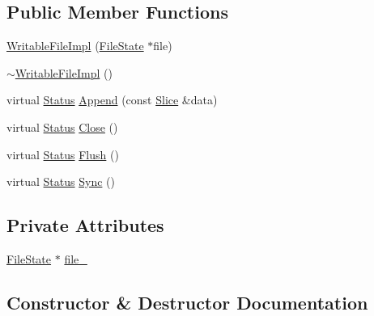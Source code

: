 \subsection*{Public Member Functions}
\begin{DoxyCompactItemize}
\item 
\hyperlink{classleveldb_1_1anonymous__namespace_02memenv_8cc_03_1_1_writable_file_impl_a564257ffed2caac8d8375fd25dcf92de}{Writable\+File\+Impl} (\hyperlink{classleveldb_1_1anonymous__namespace_02memenv_8cc_03_1_1_file_state}{File\+State} $\ast$file)
\item 
\hyperlink{classleveldb_1_1anonymous__namespace_02memenv_8cc_03_1_1_writable_file_impl_ab988ef6951b1474cc540c38fa0c0c225}{$\sim$\+Writable\+File\+Impl} ()
\item 
virtual \hyperlink{classleveldb_1_1_status}{Status} \hyperlink{classleveldb_1_1anonymous__namespace_02memenv_8cc_03_1_1_writable_file_impl_ad4dab8366ba1d0bba09026209ea6d9fb}{Append} (const \hyperlink{classleveldb_1_1_slice}{Slice} \&data)
\item 
virtual \hyperlink{classleveldb_1_1_status}{Status} \hyperlink{classleveldb_1_1anonymous__namespace_02memenv_8cc_03_1_1_writable_file_impl_a61415505144e7fe22e40e3d88682e1af}{Close} ()
\item 
virtual \hyperlink{classleveldb_1_1_status}{Status} \hyperlink{classleveldb_1_1anonymous__namespace_02memenv_8cc_03_1_1_writable_file_impl_a46189d9bb58693915d9970b6dcd6d720}{Flush} ()
\item 
virtual \hyperlink{classleveldb_1_1_status}{Status} \hyperlink{classleveldb_1_1anonymous__namespace_02memenv_8cc_03_1_1_writable_file_impl_ad3b7274e119b56a2fc46a60fafc2df0b}{Sync} ()
\end{DoxyCompactItemize}
\subsection*{Private Attributes}
\begin{DoxyCompactItemize}
\item 
\hyperlink{classleveldb_1_1anonymous__namespace_02memenv_8cc_03_1_1_file_state}{File\+State} $\ast$ \hyperlink{classleveldb_1_1anonymous__namespace_02memenv_8cc_03_1_1_writable_file_impl_a3c954968661ee3fc5324915b941f48fc}{file\+\_\+}
\end{DoxyCompactItemize}


\subsection{Constructor \& Destructor Documentation}
\hypertarget{classleveldb_1_1anonymous__namespace_02memenv_8cc_03_1_1_writable_file_impl_a564257ffed2caac8d8375fd25dcf92de}{}
